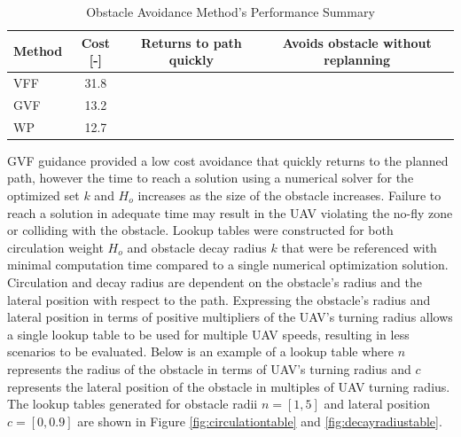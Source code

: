 \documentclass[numbered,pdftex]{ohio-etd}
\begin{document}
\begin{table}[H]
	\centering
	\caption{Obstacle Avoidance Method's Performance Summary }
	\label{table}
	\begin{tabular}{|l|c|c|c|}
		\hline
		\multicolumn{1}{|c|}{Method} & Cost {[}-{]} & Returns to path quickly & Avoids obstacle without replanning \\ \hline
		VFF                          & 31.8         &                         & \Checkmark
		\\ \hline
		GVF                          & 13.2         & \Checkmark                       & \Checkmark                                  \\ \hline
		WP                           & 12.7         & \Checkmark                       &                                    \\ \hline
	\end{tabular}
\end{table}




GVF guidance provided a low cost avoidance that quickly returns to the planned path, however the time to reach a solution using a numerical solver for the optimized set $k$ and $H_o$ increases as the size of the obstacle increases. Failure to reach a solution in adequate time may result in the UAV violating the no-fly zone or colliding with the obstacle. Lookup tables were constructed for both circulation weight $H_o$ and obstacle decay radius $k$ that were be referenced with minimal computation time compared to a single numerical optimization solution. Circulation and decay radius are dependent on the obstacle's radius and the lateral position with respect to the path. Expressing the obstacle's radius and lateral position in terms of positive multipliers of the UAV's turning radius allows a single lookup table to be used for multiple UAV speeds, resulting in less scenarios to be evaluated. Below is an example of a lookup table where $n$ represents the radius of the obstacle in terms of UAV's turning radius and $c$ represents the lateral position of the obstacle in multiples of UAV turning radius. The lookup tables generated for obstacle radii $n = [1,5]$ and lateral position $c = [0,0.9]$ are shown in Figure \ref{fig:circulationtable} and \ref{fig:decayradiustable}.
\end{document}
